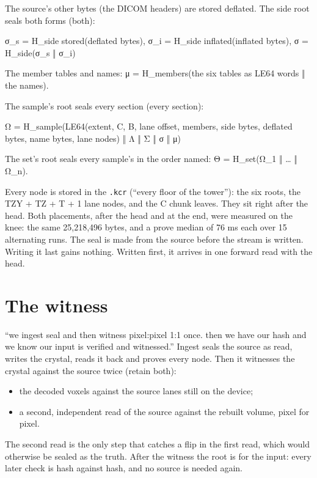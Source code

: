 The source's other bytes (the DICOM headers) are stored deflated. The side root seals both forms (both):

σ\_\allowbreak{}s = H\_\allowbreak{}side stored(deflated bytes),  σ\_\allowbreak{}i = H\_\allowbreak{}side inflated(inflated bytes),  σ = H\_\allowbreak{}side(σ\_\allowbreak{}s ‖ σ\_\allowbreak{}i)

The member tables and names: μ = H\_\allowbreak{}members(the six tables as LE64 words ‖ the names).

The sample's root seals every section (every section):

Ω = H\_\allowbreak{}sample(LE64(extent, C, B, lane offset, members, side bytes, deflated bytes, name bytes, lane nodes) ‖ Λ ‖ Σ ‖ σ ‖ μ)

The set's root seals every sample's in the order named: Θ = H\_\allowbreak{}set(Ω\_\allowbreak{}1 ‖ … ‖ Ω\_\allowbreak{}n).

Every node is stored in the \texttt{.\allowbreak{}kcr} (“every floor of the tower”): the six roots, the TZY + TZ + T + 1 lane nodes, and the C chunk leaves. They sit right after the head. Both placements, after the head and at the end, were measured on the knee: the same 25,218,496 bytes, and a prove median of 76 ms each over 15 alternating runs. The seal is made from the source before the stream is written. Writing it last gains nothing. Written first, it arrives in one forward read with the head.

\section{\texorpdfstring{The witness}{The witness}}

“we ingest seal and then witness pixel:pixel 1:1 once. then we have our hash and we know our input is verified and witnessed.” Ingest seals the source as read, writes the crystal, reads it back and proves every node. Then it witnesses the crystal against the source twice (retain both):

\begin{itemize}
\item the decoded voxels against the source lanes still on the device;
\item a second, independent read of the source against the rebuilt volume, pixel for pixel.
\end{itemize}

The second read is the only step that catches a flip in the first read, which would otherwise be sealed as the truth. After the witness the root is for the input: every later check is hash against hash, and no source is needed again.

